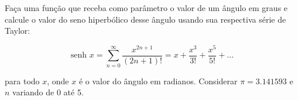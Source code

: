 
\question[10]

Faça uma função que receba como parâmetro o valor de um ângulo em graus e calcule o valor do seno hiperbólico desse ângulo usando sua respectiva série de Taylor:

\begin{equation*}
	\text{senh } x = \sum_{n=0}^{\infty} \frac{x^{2n+1}}{(2n+1)!}= x + \frac{x^3}{3!} + \frac{x^5}{5!} + \ldots 
\end{equation*}

para todo $x$, onde $x$  é o valor do ângulo em radianos. Considerar $\pi = 3.141593$ e $n$ variando de 0 até 5.